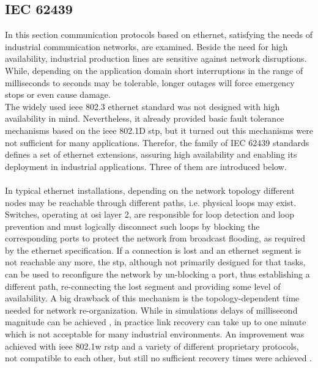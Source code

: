 \subsection{IEC 62439}
In this section communication protocols based on ethernet, satisfying the needs of industrial communication networks, are examined. Beside the need for high availability,
industrial production lines
are sensitive against network disruptions. While, depending on the application domain short interruptions in the range of milliseconds to seconds may be
tolerable, longer outages will force emergency stops or even cause damage.
\\
The widely used \gls{ieee} 802.3 ethernet standard was not designed with high availability in mind.
Nevertheless, it already provided basic fault tolerance mechanisms based on the \gls{ieee} 802.1D \gls{stp}, but it turned out this mechanisms were not 
sufficient for many applications. Therefor, the family of IEC 62439 standards defines a set of ethernet extensions, assuring high availability and enabling
its deployment in industrial applications. Three of them are introduced below.
\\
\\
In typical ethernet installations, depending on the network topology different
nodes may be reachable through different paths, i.e. physical loops may exist.
Switches, operating at \gls{osi} layer 2, are responsible for loop detection and
loop prevention and must logically disconnect such loops by blocking the corresponding ports to protect the network from broadcast flooding, as required by the ethernet specification.
If a connection is lost and an ethernet segment is not 
reachable any more, the \gls{stp}, although not primarily designed for that tasks, can be used to reconfigure the network by
un-blocking a port, thus establishing a different path, re-connecting the lost segment and providing some level of availability. 
A big drawback of this mechanism is the topology-dependent
time needed for network re-organization. While in simulations delays of millisecond magnitude can be achieved \cite{4447112}, in practice link recovery
can take up to one minute which is not acceptable for many industrial environments. An improvement was achieved with \gls{ieee} 802.1w \gls{rstp} and
a variety of different proprietary protocols, not compatible to each other, but still no sufficient recovery times were achieved \cite{1704183}.

